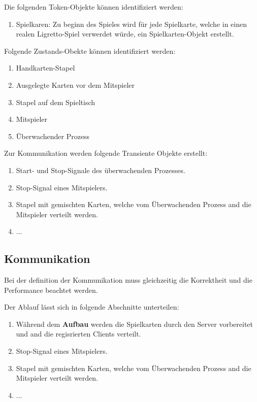 Die folgenden Token-Objekte können identifiziert werden:
\begin{enumerate}
	\item Spielkaren: Zu beginn des Spieles wird für jede Spielkarte, welche in einen realen Ligretto-Spiel verwerdet würde, ein Spielkarten-Objekt erstellt.
\end{enumerate}

Folgende Zustands-Obekte können identifiziert werden:
\begin{enumerate}
	\item Handkarten-Stapel
	\item Ausgelegte Karten vor dem Mitspieler
	\item Stapel auf dem Spieltisch
	\item Mitspieler
	\item Überwachender Prozess
\end{enumerate}

Zur Kommunikation werden folgende Transiente Objekte erstellt:
\begin{enumerate}
	\item Start- und Stop-Signale des überwachenden Prozesses.
	\item Stop-Signal eines Mitspielers.
	\item Stapel mit gemischten Karten, welche vom Überwachenden Prozess and die Mitspieler verteilt werden.
	\item ...
\end{enumerate}

\subsection{Kommunikation}

Bei der definition der Kommunikation muss gleichzeitig die Korrektheit und die Performance beachtet werden.

Der Ablauf lässt sich in folgende Abschnitte unterteilen:
\begin{enumerate}
	\item Während dem {\bf Aufbau} werden die Spielkarten durch den Server vorbereitet und and die regisrierten Clients verteilt.
	\item Stop-Signal eines Mitspielers.
	\item Stapel mit gemischten Karten, welche vom Überwachenden Prozess and die Mitspieler verteilt werden.
	\item ...
\end{enumerate}



